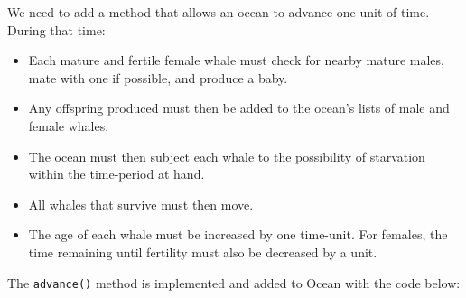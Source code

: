 \documentclass[]{book}
\providecommand{\tightlist}{%
  \setlength{\itemsep}{0pt}\setlength{\parskip}{0pt}}
\theoremstyle{definition}
\theoremstyle{definition}
\theoremstyle{remark}
\begin{document}
{We need to add a method that allows an ocean to advance one unit of
time. During that time:

\begin{itemize}
\tightlist
\item
  Each mature and fertile female whale must check for nearby mature
  males, mate with one if possible, and produce a baby.
\item
  Any offspring produced must then be added to the ocean's lists of male
  and female whales.
\item
  The ocean must then subject each whale to the possibility of
  starvation within the time-period at hand.
\item
  All whales that survive must then move.
\item
  The age of each whale must be increased by one time-unit. For females,
  the time remaining until fertility must also be decreased by a unit.
\end{itemize}

The \texttt{advance()} method is implemented and added to Ocean with the
code below:

}
\end{document}
